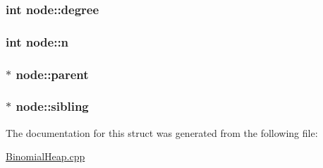 \subsubsection[{\texorpdfstring{degree}{degree}}]{\setlength{\rightskip}{0pt plus 5cm}int node\+::degree}\hypertarget{structnode_a5ef19e24e48768739e8743eccbc81434}{}\label{structnode_a5ef19e24e48768739e8743eccbc81434}
\subsubsection[{\texorpdfstring{n}{n}}]{\setlength{\rightskip}{0pt plus 5cm}int node\+::n}\hypertarget{structnode_a027ad0e5186d6cfab02c74a3da2d28a9}{}\label{structnode_a027ad0e5186d6cfab02c74a3da2d28a9}
\subsubsection[{\texorpdfstring{parent}{parent}}]{$\ast$ node\+::parent}\hypertarget{structnode_a5e88137f1d0e2f7a940bccf4c3d3a4d3}{}\label{structnode_a5e88137f1d0e2f7a940bccf4c3d3a4d3}
\subsubsection[{\texorpdfstring{sibling}{sibling}}]{$\ast$ node\+::sibling}\hypertarget{structnode_a0941f5cd2e8bd7fda70619bb099f267d}{}\label{structnode_a0941f5cd2e8bd7fda70619bb099f267d}


The documentation for this struct was generated from the following file\+:\begin{DoxyCompactItemize}
\item 
\hyperlink{BinomialHeap_8cpp}{Binomial\+Heap.\+cpp}\end{DoxyCompactItemize}
